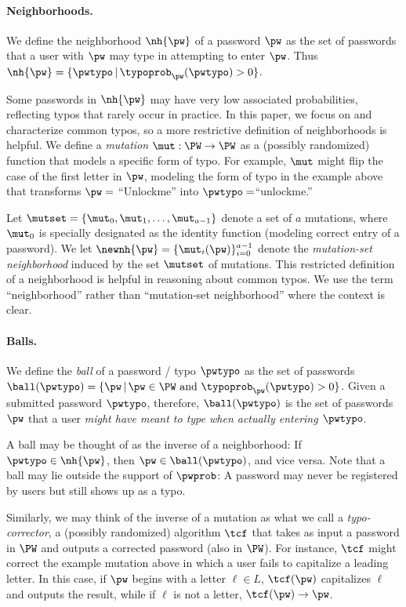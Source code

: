 \paragraph{Neighborhoods.} We define the neighborhood $\nh{\pw}$ of a password
$\pw$ as the set of passwords that a user with $\pw$ may type in attempting to
enter $\pw$. Thus $\nh{\pw} = \{\pwtypo \,|\, \typoprob_{\pw}(\pwtypo) > 0\}$. 

Some passwords in $\nh{\pw}$ may have very low associated probabilities,
reflecting typos that rarely occur in practice. In this paper, we focus on and
characterize common typos, so a more restrictive definition of neighborhoods is
helpful. We define a {\em mutation} $\mut: \PW \rightarrow \PW$ as a (possibly
randomized) function that models a specific form of typo. For example, $\mut$
might flip the case of the first letter in $\pw$, modeling the form of typo in
the example above that transforms $\pw =$ ``Unlockme'' into $\pwtypo
=$``unlockme.'' 

Let $\mutset = \{\mut_0, \mut_1, \ldots, \mut_{a-1}\}$ denote a set of $a$
mutations, where $\mut_0$ is specially designated as the identity function
(modeling correct entry of a password). We let $\newnh{\pw} =
\{\mut_i(\pw)\}_{i=0}^{a-1}$ denote the {\em mutation-set neighborhood} induced
by the set $\mutset$ of mutations. This restricted definition of a neighborhood
is helpful in reasoning about common typos. We use the term ``neighborhood''
rather than ``mutation-set neighborhood'' where the context is clear.

\paragraph{Balls.} We define the {\em ball} of a password / typo $\pwtypo$ as
the set of passwords $\ball(\pwtypo) = \{\pw \,|\, \pw \in \PW \mbox{ and }
\typoprob_{\pw}(\pwtypo) > 0\}$.  Given a submitted password $\pwtypo$,
therefore, $\ball(\pwtypo)$ is the set of passwords $\pw$ that a user {\em might
have meant to type when actually entering $\pwtypo$}. 

A ball may be thought of as the inverse of a neighborhood: If $\pwtypo \in
\nh{\pw}$, then $\pw \in \ball(\pwtypo)$, and vice versa. Note that a ball may
lie outside the support of $\pwprob$: A password may never be registered by
users but still shows up as a typo.

Similarly, we may think of the inverse of a mutation as what we call a {\em
typo-corrector}, a (possibly randomized) algorithm $\tcf$ that takes as input a
password in $\PW$ and outputs a corrected password (also in $\PW$).  
For instance, $\tcf$ might correct the example mutation above in
which a user fails to capitalize a leading letter. In this case, if $\pw$ begins
with a letter $\ell \in L$, $\tcf(\pw)$  capitalizes $\ell$ and outputs the
result, while if $\ell$ is not a letter, $\tcf(\pw) \rightarrow \pw$. 

